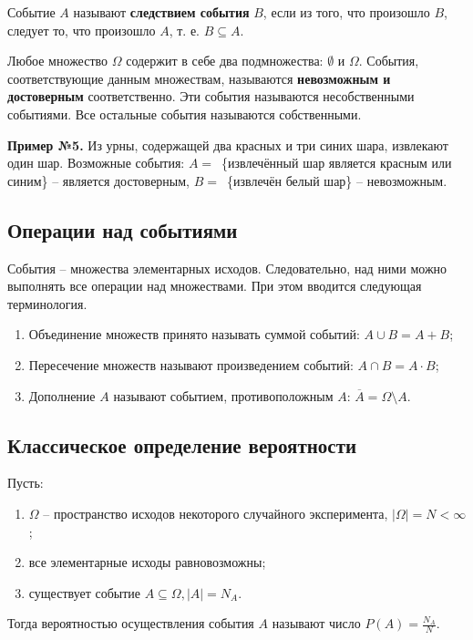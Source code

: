 Событие $A$ называют \textbf{следствием события} $B$, если из того, что произошло $B$, следует то, что произошло $A$, т. е. $B \subseteq A$.

Любое множество $\Omega$ содержит в себе два подмножества: $\emptyset$ и $\Omega$. События, соответствующие данным множествам, называются \textbf{невозможным и достоверным} соответственно. Эти события называются несобственными событиями. Все остальные события называются собственными.

\textbf{Пример №5.} Из урны, содержащей два красных и три синих шара, извлекают один шар. Возможные события: $A =$~\{извлечённый шар является красным или синим\} -- является достоверным, $B =$~\{извлечён белый шар\} -- невозможным.

\subsection*{Операции над событиями}

События -- множества элементарных исходов. Следовательно, над ними можно выполнять все операции над множествами. При этом вводится следующая терминология.

\begin{enumerate}
	\item Объединение множеств принято называть суммой событий: $A \cup B = A + B$;
	\item Пересечение множеств называют произведением событий: $A \cap B = A \cdot B$;
	\item Дополнение $A$ называют событием, противоположным $A$: $\overline{A} = \Omega \setminus A$. 	
\end{enumerate}

\subsection*{Классическое определение вероятности}

Пусть:

\begin{enumerate}[label=\arabic*)]
	\item $\Omega$ -- пространство исходов некоторого случайного эксперимента, $|\Omega| = N < \infty$;
	\item все элементарные исходы равновозможны;
	\item существует событие $A \subseteq \Omega, |A| = N_A$.
\end{enumerate}

Тогда вероятностью осуществления события $A$ называют число $P(A) = \frac{N_A}{N}.$

